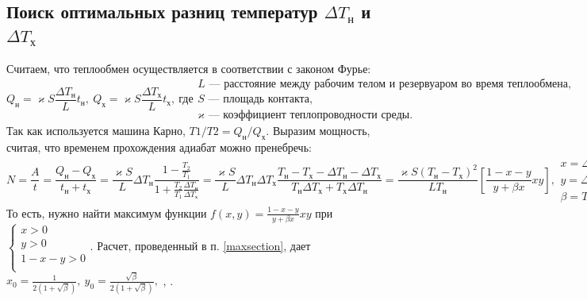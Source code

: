 \documentclass[a4paper]{article}
\begin{document}
\subsection{Поиск оптимальных разниц температур $\Delta T_\text{н}$ и $\Delta T_\text{х}$}
Считаем, что теплообмен осуществляется в соответствии с законом Фурье:
$$
Q_\text{н}=\varkappa S\frac{\Delta T_{\text{н}}}{L}t_{\text{н}},\ 
Q_\text{х}=\varkappa S\frac{\Delta T_{\text{х}}}{L}t_{\text{х}},\ 
\text{где}
\begin{array}{l}
L\text{~--- расстояние между рабочим телом и резервуаром во время теплообмена},\\
S\text{~--- площадь контакта},\\
\varkappa\text{~--- коэффициент теплопроводности среды.}
\end{array}
$$
Так как используется машина Карно,
$T1/T2=Q_{\text{н}}/Q_{\text{х}}$.\newline
Выразим мощность, считая, что временем прохождения адиабат можно пренебречь:
$$
N=\frac{A}{t}=\frac{Q_\text{н}-Q_\text{х}}{t_{\text{н}}+t_{\text{х}}}=
\frac{\varkappa S}{L}\Delta T_{\text{н}}\frac{1-\frac{T_2}{T_1}}{1+\frac{T_2}{T_1}\frac{\Delta T_{\text{н}}}{\Delta T_{\text{х}}}}=
\frac{\varkappa S}{L}\Delta T_{\text{н}}\Delta T_{\text{х}}\frac{T_{\text{н}}-T_{\text{х}}-\Delta T_{\text{н}}-\Delta T_{\text{х}}}{T_{\text{н}}\Delta T_{\text{х}}+T_{\text{х}}\Delta T_{\text{н}}}=
\frac{\varkappa S(T_{\text{н}}-T_{\text{х}})^2}{LT_{\text{н}}}\left[\frac{1-x-y}{y+\beta x}xy\right],
\begin{array}{lcr}
x=\Delta T_{\text{н}}/(T_{\text{н}}-T_{\text{х}}),\\
y=\Delta T_{\text{х}}/(T_{\text{н}}-T_{\text{х}}),\\
\beta= T_{\text{х}}/T_{\text{н}}
\end{array}
$$
То есть, нужно найти максимум функции $f(x,y)=\frac{1-x-y}{y+\beta x}xy$ при $
\left\{
\begin{array}{l}
x>0\\
y>0\\
1-x-y>0\\
\end{array}	
\right.
.
$\newline
Расчет, проведенный в п. \ref{maxsection}, дает
$x_0=\frac{1}{2(1+\sqrt{\beta})},\ y_0=\frac{\sqrt{\beta}}{2(1+\sqrt{\beta})},$\newline
{\Large{},
\fbox{$N^{max}=\frac{\varkappa S}{4L}(\sqrt{T_{\text{н}}}-\sqrt{T_{\text{х}}})^2$}.}
\newpage
\end{document}

